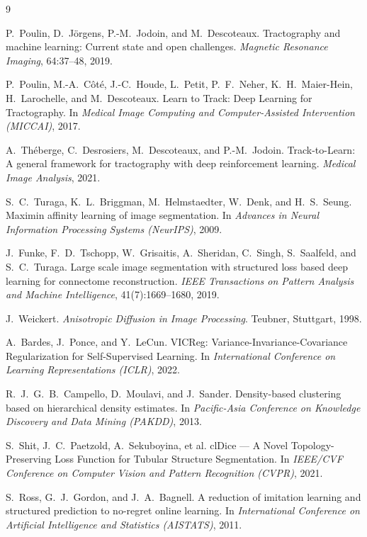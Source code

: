 \documentclass[10pt,twocolumn,a4paper]{article}
\begin{document}
\begin{thebibliography}{9}

P.~Poulin, D.~J\"orgens, P.-M.~Jodoin, and M.~Descoteaux.
\newblock Tractography and machine learning: Current state and open challenges.
\newblock \emph{Magnetic Resonance Imaging}, 64:37--48, 2019.

P.~Poulin, M.-A.~C\^ot\'e, J.-C.~Houde, L.~Petit, P.~F.~Neher, K.~H.~Maier-Hein,
  H.~Larochelle, and M.~Descoteaux.
\newblock Learn to Track: Deep Learning for Tractography.
\newblock In \emph{Medical Image Computing and Computer-Assisted Intervention
  (MICCAI)}, 2017.

A.~Th\'eberge, C.~Desrosiers, M.~Descoteaux, and P.-M.~Jodoin.
\newblock Track-to-Learn: A general framework for tractography with deep
  reinforcement learning.
\newblock \emph{Medical Image Analysis}, 2021.

S.~C.~Turaga, K.~L.~Briggman, M.~Helmstaedter, W.~Denk, and H.~S.~Seung.
\newblock Maximin affinity learning of image segmentation.
\newblock In \emph{Advances in Neural Information Processing Systems (NeurIPS)},
  2009.

J.~Funke, F.~D.~Tschopp, W.~Grisaitis, A.~Sheridan, C.~Singh, S.~Saalfeld, and
  S.~C.~Turaga.
\newblock Large scale image segmentation with structured loss based deep learning
  for connectome reconstruction.
\newblock \emph{IEEE Transactions on Pattern Analysis and Machine Intelligence},
  41(7):1669--1680, 2019.

J.~Weickert.
\newblock \emph{Anisotropic Diffusion in Image Processing}.
\newblock Teubner, Stuttgart, 1998.

A.~Bardes, J.~Ponce, and Y.~LeCun.
\newblock VICReg: Variance-Invariance-Covariance Regularization for
  Self-Supervised Learning.
\newblock In \emph{International Conference on Learning Representations (ICLR)},
  2022.

R.~J.~G.~B.~Campello, D.~Moulavi, and J.~Sander.
\newblock Density-based clustering based on hierarchical density estimates.
\newblock In \emph{Pacific-Asia Conference on Knowledge Discovery and Data Mining
  (PAKDD)}, 2013.

S.~Shit, J.~C.~Paetzold, A.~Sekuboyina, et al.
\newblock clDice --- A Novel Topology-Preserving Loss Function for Tubular
  Structure Segmentation.
\newblock In \emph{IEEE/CVF Conference on Computer Vision and Pattern Recognition
  (CVPR)}, 2021.

S.~Ross, G.~J.~Gordon, and J.~A.~Bagnell.
\newblock A reduction of imitation learning and structured prediction to no-regret
  online learning.
\newblock In \emph{International Conference on Artificial Intelligence and
  Statistics (AISTATS)}, 2011.

\end{thebibliography}
\end{document}
